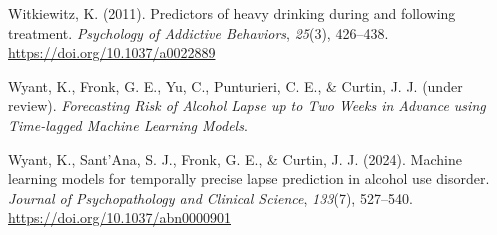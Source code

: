 \documentclass[
  letterpaper,
  DIV=11,
  numbers=noendperiod]{scrartcl}
\newlength{\cslhangindent}
\newenvironment{CSLReferences}[2] %
 {\begin{list}{}{%
  \setlength{\itemindent}{0pt}
  \setlength{\leftmargin}{0pt}
  \setlength{\parsep}{0pt}
  \ifodd #1
   \setlength{\leftmargin}{\cslhangindent}
   \setlength{\itemindent}{-1\cslhangindent}
  \fi
  \setlength{\itemsep}{#2\baselineskip}}}
 {\end{list}}
\begin{document}
\begin{CSLReferences}{1}{0}
Witkiewitz, K. (2011). Predictors of heavy drinking during and following
treatment. \emph{Psychology of Addictive Behaviors}, \emph{25}(3),
426--438. \url{https://doi.org/10.1037/a0022889}

Wyant, K., Fronk, G. E., Yu, C., Punturieri, C. E., \& Curtin, J. J.
(under review). \emph{Forecasting {Risk} of {Alcohol Lapse} up to {Two
Weeks} in {Advance} using {Time-lagged Machine Learning Models}}.

Wyant, K., Sant'Ana, S. J., Fronk, G. E., \& Curtin, J. J. (2024).
Machine learning models for temporally precise lapse prediction in
alcohol use disorder. \emph{Journal of Psychopathology and Clinical
Science}, \emph{133}(7), 527--540.
\url{https://doi.org/10.1037/abn0000901}

\end{CSLReferences}
\end{document}
